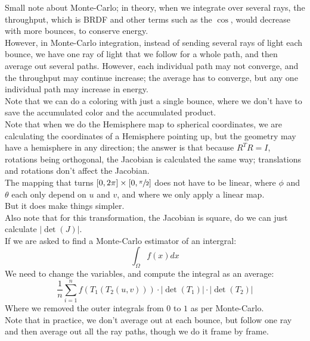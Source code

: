 \documentclass[12pt]{article}
\begin{document}
Small note about Monte-Carlo;
in theory, when we integrate over several
rays, the throughput, which is BRDF
and other terms such as the $\cos$,
would decrease with more bounces, to conserve
energy. \\
However, in Monte-Carlo integration,
instead of sending several rays of light
each bounce, we have one ray of light
that we follow for a whole path,
and then average out several paths. 
However, each individual path may not converge,
and the throughput may continue increase;
the average has to converge, but any one
individual path may increase in energy. \\

Note that we can do a coloring
with just a single bounce, where we don't
have to save the accumulated color
and the accumulated product. \\

Note that when we do the Hemisphere map
to spherical coordinates, we are calculating
the coordinates of a Hemisphere pointing up,
but the geometry may have a hemisphere in any direction;
the answer is that because $R^TR = I$,
rotations being orthogonal,
the Jacobian is calculated the same way;
translations and rotations don't affect the
Jacobian. \\

The mapping that turns $[0, 2\pi] 
\times [0, \sfrac{\pi}{2}]$
does not have to be linear, where
$\phi$ and $\theta$
each only depend on $u$ and $v$,
and where we only apply a linear map. \\
But it does make things simpler. \\
Also note that for this transformation,
the Jacobian is square, do we can just calculate
$|\det(J)|$. \\

If we are asked to find a Monte-Carlo estimator of
an intergral:
\[ \int_\Omega f(x) dx \]
We need to change the variables,
and compute the integral as an average:
\[ \dfrac{1}{n}\sum_{i=1}^n f(T_1(T_2(u, v)))
\cdot |\det(T_1)| \cdot |\det(T_2)| \]
Where we removed the outer integrals
from $0$ to $1$ as per Monte-Carlo. \\
Note that in practice, we don't average
out at each bounce, but follow one ray
and then average out all the ray paths,
though we do it frame by frame. \\

\newpage
\end{document}
